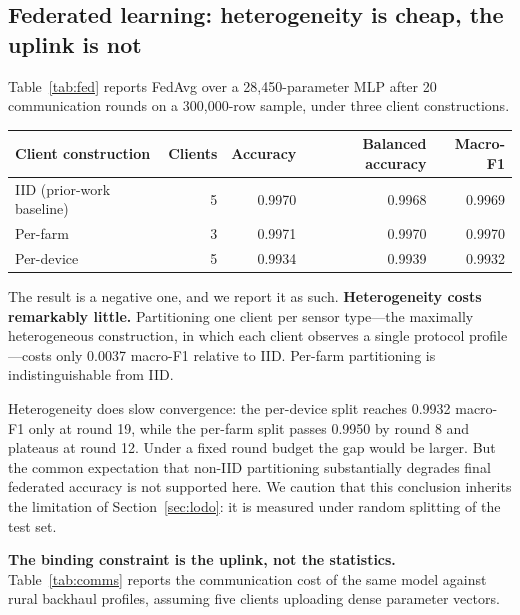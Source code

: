 \subsection{Federated learning: heterogeneity is cheap, the uplink is not}
\label{sec:fed}

Table~\ref{tab:fed} reports FedAvg over a 28{,}450-parameter MLP after 20
communication rounds on a 300{,}000-row sample, under three client
constructions.

\begin{wtable}
\centering
\footnotesize
\caption{Global model after 20 FedAvg rounds by client construction.}
\label{tab:fed}
\begin{fittable}
\begin{tabular}{lrrrr}
\toprule
Client construction & Clients & Accuracy & Balanced accuracy & Macro-F1 \\
\midrule
IID (prior-work baseline) & 5 & 0.9970 & 0.9968 & 0.9969 \\
Per-farm                  & 3 & 0.9971 & 0.9970 & 0.9970 \\
Per-device                & 5 & 0.9934 & 0.9939 & 0.9932 \\
\bottomrule
\end{tabular}
\end{fittable}
\end{wtable}

The result is a negative one, and we report it as such. \textbf{Heterogeneity
costs remarkably little.} Partitioning one client per sensor type---the
maximally heterogeneous construction, in which each client observes a single
protocol profile---costs only 0.0037 macro-F1 relative to IID. Per-farm
partitioning is indistinguishable from IID.

Heterogeneity does slow convergence: the per-device split reaches 0.9932
macro-F1 only at round 19, while the per-farm split passes 0.9950 by round 8
and plateaus at round 12. Under a fixed round budget the gap would be larger.
But the common expectation that non-IID partitioning substantially degrades
final federated accuracy is not supported here. We caution that this conclusion
inherits the limitation of Section~\ref{sec:lodo}: it is measured under random
splitting of the test set.

\textbf{The binding constraint is the uplink, not the statistics.}
Table~\ref{tab:comms} reports the communication cost of the same model against
rural backhaul profiles, assuming five clients uploading dense parameter
vectors.

